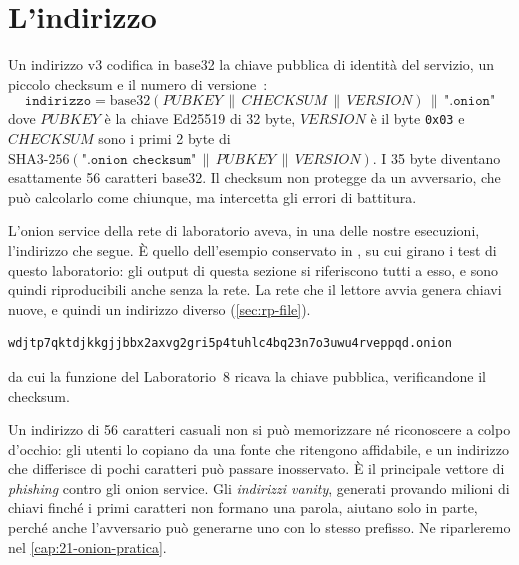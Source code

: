 \section{L'indirizzo}\label{sec:os-indirizzo}

Un indirizzo v3 codifica in base32 la chiave pubblica di identità del servizio, un piccolo checksum e il numero di versione~:
\[
\texttt{indirizzo} = \mathrm{base32}(\mathit{PUBKEY} \,\|\, \mathit{CHECKSUM} \,\|\, \mathit{VERSION}) \,\|\, \texttt{".onion"}
\]
dove $\mathit{PUBKEY}$ è la chiave Ed25519 di 32 byte, $\mathit{VERSION}$ è il byte \texttt{0x03} e $\mathit{CHECKSUM}$ sono i primi 2 byte di $\mathrm{SHA3\text{-}256}(\texttt{".onion checksum"} \,\|\, \mathit{PUBKEY} \,\|\, \mathit{VERSION})$. I 35 byte diventano esattamente 56 caratteri base32. Il checksum non protegge da un avversario, che può calcolarlo come chiunque, ma intercetta gli errori di battitura.

L'onion service della rete di laboratorio aveva, in una delle nostre esecuzioni, l'indirizzo che segue. È quello dell'esempio conservato in , su cui girano i test di questo laboratorio: gli output di questa sezione si riferiscono tutti a esso, e sono quindi riproducibili anche senza la rete. La rete che il lettore avvia genera chiavi nuove, e quindi un indirizzo diverso (\cref{sec:rp-file}).
\begin{lstlisting}[numbers=none]
wdjtp7qktdjkkgjjbbx2axvg2gri5p4tuhlc4bq23n7o3uwu4rveppqd.onion
\end{lstlisting}
da cui la funzione  del Laboratorio~8 ricava la chiave pubblica, verificandone il checksum.

\begin{attenzione}
Un indirizzo di 56 caratteri casuali non si può memorizzare né riconoscere a colpo d'occhio: gli utenti lo copiano da una fonte che ritengono affidabile, e un indirizzo che differisce di pochi caratteri può passare inosservato. È il principale vettore di \emph{phishing} contro gli onion service. Gli \emph{indirizzi vanity}, generati provando milioni di chiavi finché i primi caratteri non formano una parola, aiutano solo in parte, perché anche l'avversario può generarne uno con lo stesso prefisso. Ne riparleremo nel \cref{cap:21-onion-pratica}.
\end{attenzione}

